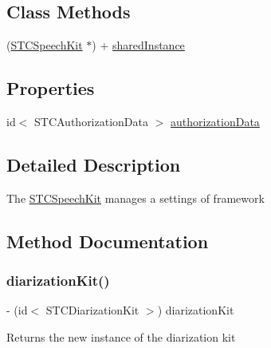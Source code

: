 \subsection*{Class Methods}
\begin{DoxyCompactItemize}
\item 
(\hyperlink{interface_s_t_c_speech_kit}{S\+T\+C\+Speech\+Kit} $\ast$) + \hyperlink{interface_s_t_c_speech_kit_ab2173dfafaf5becc7dda35b0937dd38f}{shared\+Instance}
\end{DoxyCompactItemize}
\subsection*{Properties}
\begin{DoxyCompactItemize}
\item 
id$<$ S\+T\+C\+Authorization\+Data $>$ \hyperlink{interface_s_t_c_speech_kit_acb1dabce194bf1a3a4bfdf5144537cf6}{authorization\+Data}
\end{DoxyCompactItemize}


\subsection{Detailed Description}
The \textquotesingle{}\hyperlink{interface_s_t_c_speech_kit}{S\+T\+C\+Speech\+Kit}\textquotesingle{} manages a settings of framework 

\subsection{Method Documentation}
\hypertarget{interface_s_t_c_speech_kit_ad246bb671e520e5f1b90810f2e312dbf}{}\label{interface_s_t_c_speech_kit_ad246bb671e520e5f1b90810f2e312dbf} 
\subsubsection{\texorpdfstring{diarization\+Kit()}{diarizationKit()}}
{\footnotesize\ttfamily -\/ (id$<$ S\+T\+C\+Diarization\+Kit $>$) diarization\+Kit \begin{DoxyParamCaption}{ }\end{DoxyParamCaption}}

Returns the new instance of the diarization kit \hypertarget{interface_s_t_c_speech_kit_aef8919d819020556e6f2c363ff65516a}{}\label{interface_s_t_c_speech_kit_aef8919d819020556e6f2c363ff65516a} 

